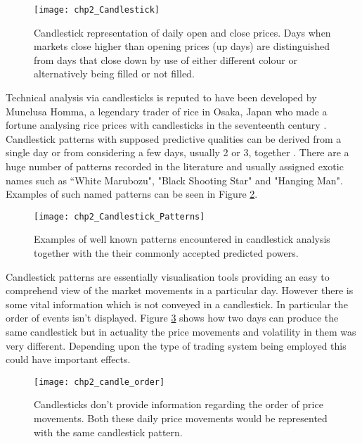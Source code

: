 \begin{figure}[tbph!]
\centering
\texttt{[image: chp2\_Candlestick]}
\caption[Candlestick representation of daily open and close prices]{Candlestick representation of daily open and close prices. Days when markets close higher than opening prices (up days) are distinguished from days that close down by use of either different colour or alternatively being filled or not filled.}
\label{fig:Candlestick}
\end{figure}

Technical analysis via candlesticks is reputed to have been developed by Munelusa Homma, a legendary trader of rice in Osaka, Japan who made a fortune analysing rice prices with candlesticks in the seventeenth century \citep{nison2001japanese}. Candlestick patterns with supposed predictive qualities can be derived from a single day or from considering a few days, usually 2 or 3, together \citep{bigalow2011profitable}. There are a huge number of patterns recorded in the literature and usually assigned exotic names such as \textquotedblleft White Marubozu", "Black Shooting Star" and "Hanging Man". Examples of such named patterns can be seen in Figure \ref{fig:Candlestick_Patterns}.

\begin{figure}[tbph!]
\centering
\texttt{[image: chp2\_Candlestick\_Patterns]}
\caption[Examples of well known candlestick patterns]{Examples of well known patterns encountered in candlestick analysis together with the their commonly accepted predicted powers.}
\label{fig:Candlestick_Patterns}
\end{figure}

Candlestick patterns are essentially visualisation tools providing an easy to comprehend view of the market movements in a particular day. However there is some vital information which is not conveyed in a candlestick. In particular the order of events isn't displayed. Figure \ref{fig:chp2_candle_order} shows how two days can produce the same candlestick but in actuality the price movements and volatility in them was very different. Depending upon the type of trading system being employed this could have important effects.

\begin{figure}[tbph!]
\centering
\texttt{[image: chp2\_candle\_order]}
\caption[Candlesticks and market movement]{Candlesticks don't provide information regarding the order of price movements. Both these daily price movements would be represented with the same candlestick pattern.}
\label{fig:chp2_candle_order}
\end{figure}


